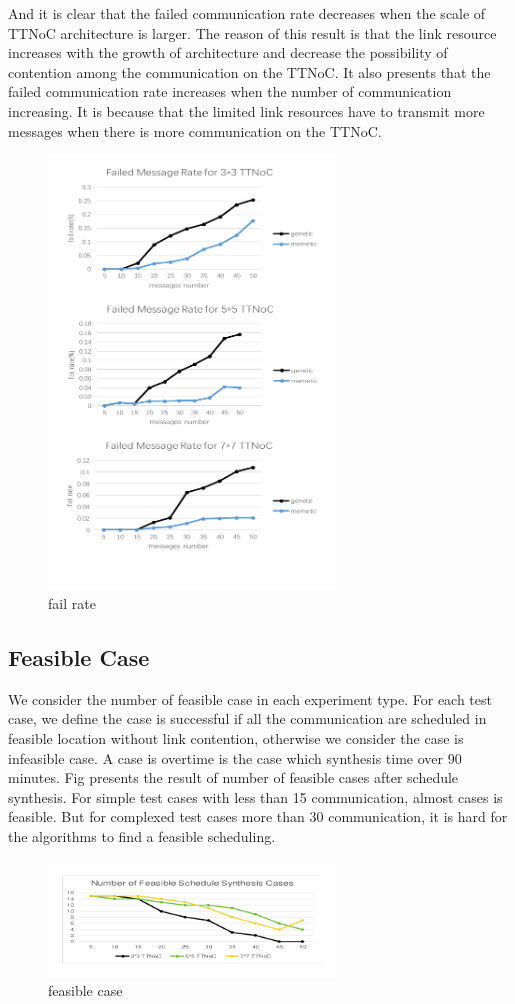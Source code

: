 \documentclass[journal]{IEEEtran}
\begin{document}
And it is clear that the failed communication rate decreases when the scale of TTNoC architecture is larger. The reason of this result is that the link resource increases with the growth of architecture and decrease the possibility of contention among the communication on the TTNoC. It also presents that the failed communication rate increases when the number of communication increasing. It is because that the limited link resources have to transmit more messages when there is more communication on the TTNoC.
\begin{figure}[!t]
	\centering
	\includegraphics[width=3in]{picture/rate}
	\caption{fail rate}
	\label{f:fail}
\end{figure}

\subsection{Feasible Case}

We consider the number of feasible  case in each experiment type. For each test case, we define the case is successful if all the communication are scheduled in feasible location without link contention, otherwise we consider the case is infeasible case. A case is overtime is the case which synthesis time over 90 minutes. Fig presents the result of number of feasible cases after schedule synthesis. For simple test cases with less than 15 communication, almost cases is feasible. But for complexed test cases more than 30 communication, it is hard for the algorithms to find a feasible scheduling.
\begin{figure}[!t]
	\centering
	\includegraphics[width=3in]{picture/feasible}
	\caption{feasible case}
	\label{f:feasible}
\end{figure}
\end{document}
